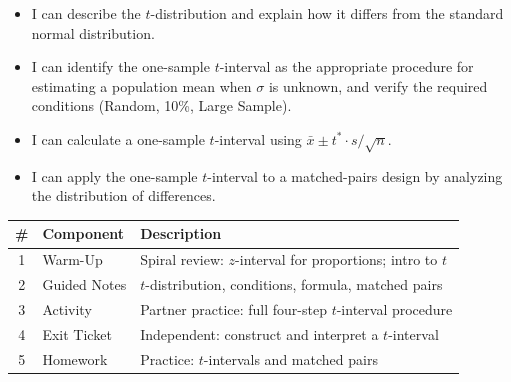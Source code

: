 \documentclass[10pt]{article}
\begin{document}

\vspace{2.4cm}
\namedateperiod

\begin{learningtargetbox}
\begin{itemize}
    \item I can describe the $t$-distribution and explain how it differs from the
          standard normal distribution.
    \item I can identify the one-sample $t$-interval as the appropriate procedure for
          estimating a population mean when $\sigma$ is unknown, and verify the required
          conditions (Random, 10\%, Large Sample).
    \item I can calculate a one-sample $t$-interval using $\bar x \pm t^* \cdot s/\sqrt{n}$.
    \item I can apply the one-sample $t$-interval to a matched-pairs design by analyzing
          the distribution of differences.
\end{itemize}
\end{learningtargetbox}

\begin{tocbox}
\renewcommand{\arraystretch}{1.5}
\begin{tabularx}{\linewidth}{clX}
    \textbf{\#} & \textbf{Component} & \textbf{Description} \\
    \hline
    1 & Warm-Up      & Spiral review: $z$-interval for proportions; intro to $t$ \\
    2 & Guided Notes & $t$-distribution, conditions, formula, matched pairs \\
    3 & Activity     & Partner practice: full four-step $t$-interval procedure \\
    4 & Exit Ticket  & Independent: construct and interpret a $t$-interval \\
    5 & Homework     & Practice: $t$-intervals and matched pairs \\
\end{tabularx}
\end{tocbox}
\end{document}
